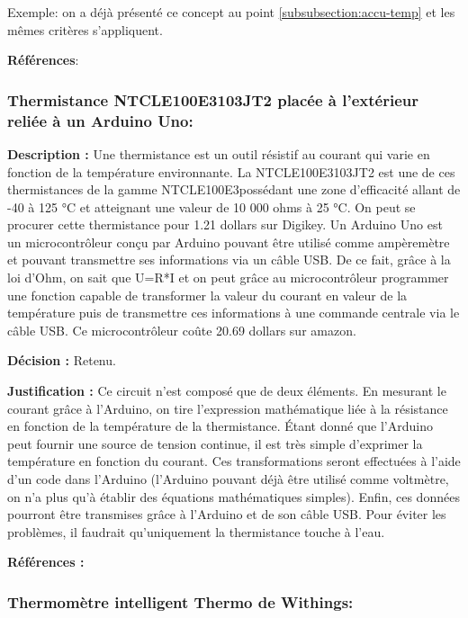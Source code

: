 Exemple: on a déjà présenté ce concept au point \ref{subsubsection:accu-temp} et les mêmes critères s'appliquent.

\textbf{Références}: \cite{Ares} \cite{AmAc} \cite{CaAc}

\subsubsection{Thermistance NTCLE100E3103JT2 placée à l’extérieur reliée à un Arduino Uno:}
\label{thermis}

\textbf{Description :} Une thermistance est un outil résistif au courant qui varie en fonction de la température environnante. La NTCLE100E3103JT2 est une de ces thermistances de la gamme NTCLE100E3possédant une zone d’efficacité allant de -40 à 125 °C et atteignant une valeur de 10 000 ohms à 25 °C. On peut se procurer cette thermistance pour 1.21 dollars sur Digikey. Un Arduino Uno est un microcontrôleur conçu par Arduino pouvant être utilisé comme ampèremètre et pouvant transmettre ses informations via un câble USB. De ce fait, grâce à la loi d’Ohm, on sait que U=R*I et on peut grâce au microcontrôleur programmer une fonction capable de transformer la valeur du courant en valeur de la température puis de transmettre ces informations à une commande centrale via le câble USB. Ce microcontrôleur coûte 20.69 dollars sur amazon. 

\textbf{Décision :} Retenu.

\textbf{Justification :} Ce circuit n’est composé que de deux éléments. En mesurant le courant grâce à l’Arduino, on tire l’expression mathématique liée à la résistance en fonction de la température de la thermistance. Étant donné que l’Arduino peut fournir une source de tension continue, il est très simple d’exprimer la température en fonction du courant. Ces transformations seront effectuées à l’aide d’un code dans l’Arduino (l’Arduino pouvant déjà être utilisé comme voltmètre, on n’a plus qu’à établir des équations mathématiques simples). Enfin, ces données pourront être transmises grâce à l’Arduino et de son câble USB. Pour éviter les problèmes, il faudrait qu'uniquement la thermistance touche à l'eau.

\textbf{Références :} \cite{TuAr} \cite{DaTh} \cite{AmAr}

\subsubsection{Thermomètre intelligent Thermo de Withings:}

